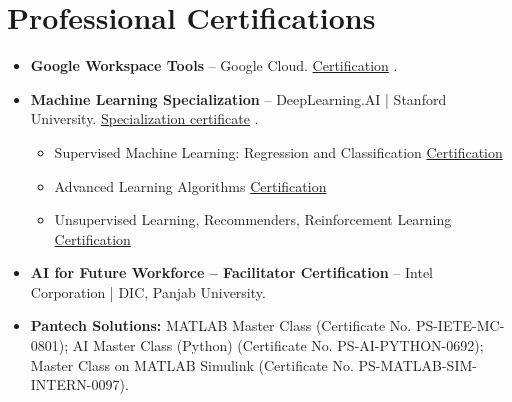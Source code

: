 \documentclass[a4paper,11pt]{article}
\newif\ifCVShowLinkIcons
\newcommand{\cvExternalLinkIcon}{}
\renewcommand{\cvExternalLinkIcon}{\raisebox{.15ex}{\footnotesize\faExternalLink*}}
\let\hrefWithoutArrow\href
\renewcommand{\href}[2]{%
  \hrefWithoutArrow{#1}{#2\ifCVShowLinkIcons\hspace{0.12em}\cvExternalLinkIcon\fi}%
}
\newcommand{\cvbullet}[1]{\item #1}
\begin{document}
\section*{Professional Certifications}
\begin{itemize}
  \cvbullet{\textbf{Google Workspace Tools} -- Google Cloud. \href{https://www.credly.com/badges/5282c582-50f7-4e8d-aece-5ed7fc423548/public_url}{Certification}.}
  \cvbullet{\textbf{Machine Learning Specialization} -- DeepLearning.AI | Stanford University. \href{https://coursera.org/share/23a8c527cbf504de6b244773e8f620a0}{Specialization certificate}.}
  \begin{itemize}
    \item Supervised Machine Learning: Regression and Classification \hfill \href{https://www.coursera.org/account/accomplishments/certificate/6H4HVCH4PACB}{Certification}
    \item Advanced Learning Algorithms \hfill \href{https://www.coursera.org/account/accomplishments/certificate/CNEYQNJUWYEN}{Certification}
    \item Unsupervised Learning, Recommenders, Reinforcement Learning \hfill \href{https://www.coursera.org/account/accomplishments/certificate/WH3FGLNUYHWU}{Certification}
  \end{itemize}
  \cvbullet{\textbf{AI for Future Workforce -- Facilitator Certification} -- Intel Corporation | DIC, Panjab University.}
  \cvbullet{\textbf{Pantech Solutions:} MATLAB Master Class (Certificate No. PS-IETE-MC-0801); AI Master Class (Python) (Certificate No. PS-AI-PYTHON-0692); Master Class on MATLAB Simulink (Certificate No. PS-MATLAB-SIM-INTERN-0097).}
\end{itemize}
\end{document}
